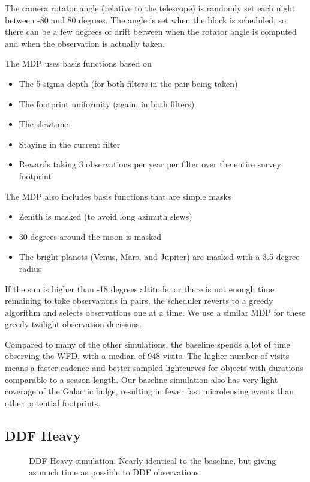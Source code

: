 The camera rotator angle (relative to the telescope) is randomly set each night between -80 and 80 degrees. The angle is set when the block is scheduled, so there can be a few degrees of drift between when the rotator angle is computed and when the observation is actually taken.

The MDP uses basis functions based on
\begin{itemize}
    \item{The 5-sigma depth (for both filters in the pair being taken)}
    \item{The footprint uniformity (again, in both filters)}
    \item{The slewtime}
    \item{Staying in the current filter}
    \item{Rewards taking 3 observations per year per filter over the entire survey footprint} 
\end{itemize}
The MDP also includes basis functions that are simple masks
\begin{itemize}
    \item{Zenith is masked (to avoid long azimuth slews)}
    \item{30 degrees around the moon is masked}
    \item{The bright planets (Venus, Mars, and Jupiter) are masked with a 3.5 degree radius}
\end{itemize}


If the sun is higher than -18 degrees altitude, or there is not enough time remaining to take observations in pairs, the scheduler reverts to a greedy algorithm and selects observations one at a time. We use a similar MDP for these greedy twilight observation decisions. 


Compared to many of the other simulations, the baseline spends a lot of time observing the WFD, with a median of 948 visits. The higher number of visits means a faster cadence and better sampled lightcurves for objects with durations comparable to a season length. Our baseline simulation also has very light coverage of the Galactic bulge, resulting in fewer fast microlensing events than other potential footprints. 

\subsection{DDF Heavy}

\begin{figure}
\caption{DDF Heavy simulation. Nearly identical to the baseline, but giving as much time as possible to DDF observations.}\label{fig:ddfheavy}
\end{figure}


